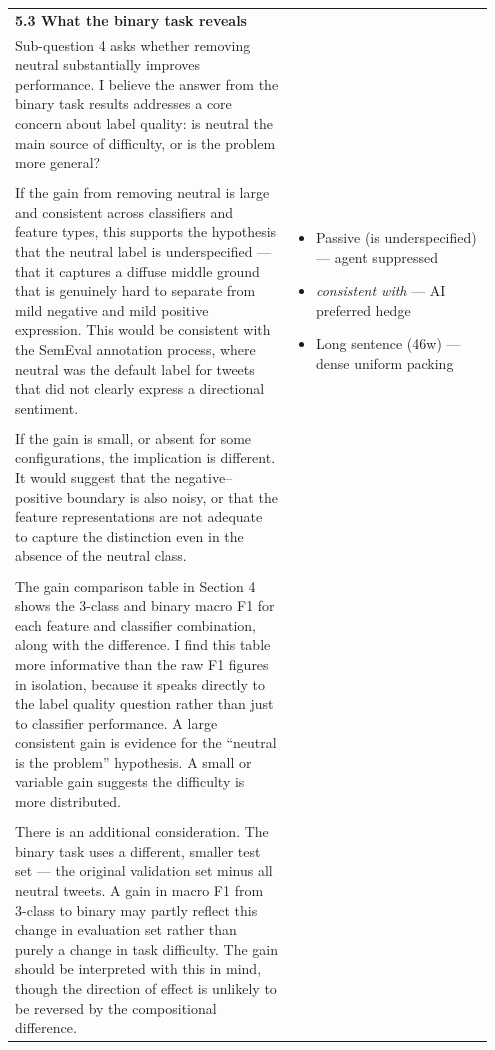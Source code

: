 \documentclass[11pt]{article}
\begin{document}
\begin{longtable}{|p{0.55\linewidth}|p{0.40\linewidth}|}
\hline
\rule{0pt}{3.5cm} & \\
\hline
\textbf{5.3 What the binary task reveals}\\[4pt]
Sub-question 4 asks whether removing neutral substantially improves performance. I believe the answer from the binary task results addresses a core concern about label quality: is neutral the main source of difficulty, or is the problem more general? &  \\[2pt]
\hline
\rule{0pt}{3.5cm} & \\
\hline
If the gain from removing neutral is large and consistent across classifiers and feature types, this supports the hypothesis that the neutral label is underspecified --- that it captures a diffuse middle ground that is genuinely hard to separate from mild negative and mild positive expression. This would be consistent with the SemEval annotation process, where neutral was the default label for tweets that did not clearly express a directional sentiment. & \begin{itemize}[leftmargin=1em,itemsep=1pt,topsep=1pt,parsep=0pt]
  \item Passive (is underspecified) --- agent suppressed
  \item \textit{consistent with} --- AI preferred hedge
  \item Long sentence (46w) --- dense uniform packing
\end{itemize} \\[2pt]
\hline
\rule{0pt}{3.5cm} & \\
\hline
If the gain is small, or absent for some configurations, the implication is different. It would suggest that the negative--positive boundary is also noisy, or that the feature representations are not adequate to capture the distinction even in the absence of the neutral class. &  \\[2pt]
\hline
\rule{0pt}{3.5cm} & \\
\hline
The gain comparison table in Section 4 shows the 3-class and binary macro F1 for each feature and classifier combination, along with the difference. I find this table more informative than the raw F1 figures in isolation, because it speaks directly to the label quality question rather than just to classifier performance. A large consistent gain is evidence for the ``neutral is the problem'' hypothesis. A small or variable gain suggests the difficulty is more distributed. &  \\[2pt]
\hline
\rule{0pt}{3.5cm} & \\
\hline
There is an additional consideration. The binary task uses a different, smaller test set --- the original validation set minus all neutral tweets. A gain in macro F1 from 3-class to binary may partly reflect this change in evaluation set rather than purely a change in task difficulty. The gain should be interpreted with this in mind, though the direction of effect is unlikely to be reversed by the compositional difference. & \begin{itemize}[leftmargin=1em,itemsep=1pt,topsep=1pt,parsep=0pt]

\end{itemize}
\end{longtable}
\end{document}
